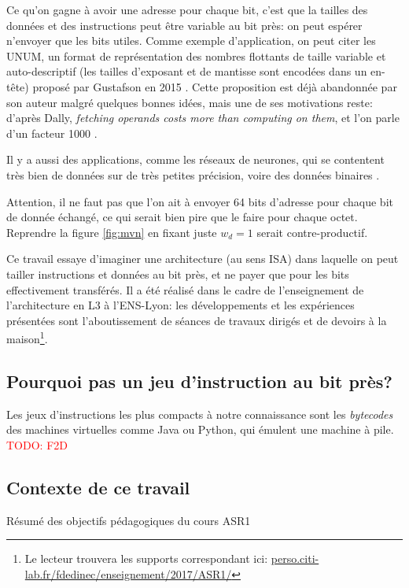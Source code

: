 \documentclass[architecture]{compas2018}
\newcommand{\todo}[1]{\textcolor{red}{TODO: #1}}
\begin{document}
Ce qu'on gagne à avoir une adresse pour chaque bit, c'est que la tailles des données et des instructions peut être variable au bit près: on peut espérer n'envoyer que les bits utiles.
Comme exemple d'application, on peut citer les UNUM, un format de représentation des nombres flottants de taille variable et auto-descriptif (les tailles d'exposant et de mantisse sont encodées dans un en-tête) proposé par  Gustafson en 2015 \cite{2015-02-GUSTAFSON}.
Cette proposition est déjà abandonnée par son auteur \cite{2016-09-TICHY} malgré quelques bonnes idées, mais une de ses  motivations reste: 
d'après Dally, \emph{fetching operands costs more than computing on them}, et l'on parle d'un facteur 1000 \cite{Dally:SC2010}.


Il y a aussi des applications, comme les réseaux de neurones, qui se contentent très bien de données sur de très petites précision, voire des données binaires \cite{AndriCRB16,AlemdarEtAl2017:TernaryCNN,AmiriEtAl2018:mixedPrecCNN,Preusser:DATE2018:heteroCNN}. 

Attention, il ne faut pas que l'on ait à envoyer 64 bits d'adresse pour chaque bit de donnée échangé, ce qui serait bien pire que le faire pour chaque octet. 
Reprendre la figure \ref{fig:mvn} en fixant juste $w_d=1$ serait contre-productif.

Ce travail essaye d'imaginer une architecture (au sens ISA) dans laquelle on peut tailler instructions et données au bit près, et ne payer que pour les bits effectivement transférés.
Il a été réalisé dans le cadre de l'enseignement de l'architecture en L3 à l'ENS-Lyon: les développements et les expériences présentées sont l'aboutissement de séances de travaux dirigés et de devoirs à la maison\footnote{Le lecteur trouvera les supports correspondant ici: \url{perso.citi-lab.fr/fdedinec/enseignement/2017/ASR1/}}. 

\iffalse
\subsection{Pourquoi pas un jeu d'instruction au bit près?}

Les jeux d'instructions les plus compacts à notre connaissance sont les \emph{bytecodes} des machines virtuelles comme Java ou Python, qui émulent une machine à pile.
\todo{F2D}

\subsection{Contexte de ce travail}
Résumé des objectifs pédagogiques du cours ASR1
\end{document}
